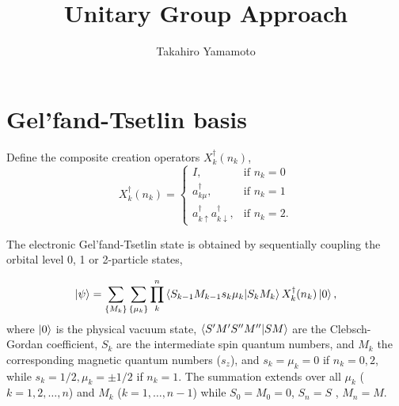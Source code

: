 \documentclass[11pt, oneside]{article}   	%
\title{Unitary Group Approach}
\author{Takahiro Yamamoto}
\begin{document}
\maketitle
\section{Gel'fand-Tsetlin basis}
Define the composite creation operators $X^{\dagger}_k (n_k)$,
\begin{equation}
X^{\dagger}_k (n_k) = 
\begin{cases}
I, & \text{if $n_k = 0$} \\
a^{\dagger}_{k \mu}, &  \text{if $n_k = 1$} \\
a^{\dagger}_{k \uparrow} a^{\dagger}_{k \downarrow}, &  \text{if $n_k = 2$}.
\end{cases}
\end{equation}

The electronic Gel'fand-Tsetlin state is obtained by sequentially coupling the orbital level 0, 1 or 2-particle states,

\begin{equation}
\ket{\psi} = \sum_{\{ M_k \}} \sum_{\{ \mu_k \}} \prod^n_k \braket{S_{k-1} M_{k-1} s_k \mu_k | S_k M_k} X^{\dagger}_k (n_k) \ket{0},
\end{equation}
where $ \ket{0}$ is the physical vacuum state, 
$\braket{S^{\prime} M^{\prime} S^{\prime \prime} M^{\prime \prime} | S M}$ are the Clebsch-Gordan coefficient,
$S_k$ are the intermediate spin quantum numbers, and $M_k$ the corresponding magnetic quantum numbers ($s_z$),
and $s_k = \mu_k = 0$ if $n_k = 0, 2$, while $s_k = 1/2, \mu_k = \pm 1/2$ if $n_k = 1$.
The summation extends over all $\mu_k$ ($k = 1, 2, \dots ,n$) and $M_k$ ($k = 1, \dots, n-1$)
while $S_0 = M_0 = 0$, $S_n = S$ , $M_n = M$.
\end{document}
